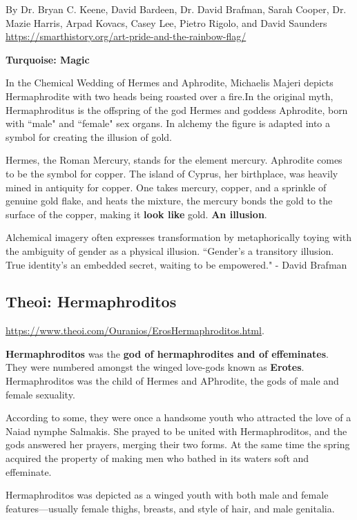 By Dr. Bryan C. Keene, David Bardeen, Dr. David Brafman, Sarah Cooper, Dr. Mazie Harris, Arpad Kovacs, Casey Lee, Pietro Rigolo, and David Saunders \url{https://smarthistory.org/art-pride-and-the-rainbow-flag/}

\textbf{Turquoise: Magic}

In the Chemical Wedding of Hermes and Aphrodite, Michaelis Majeri depicts Hermaphrodite with two heads being roasted over a fire.In the original myth, Hermaphroditus is the offspring of the god Hermes and goddess Aphrodite, born with ``male" and ``female" sex organs. In alchemy the figure is adapted into a symbol for creating the illusion of gold.

\begin{rmk}
    Hermes, the Roman Mercury, stands for the element mercury. Aphrodite comes to be the symbol for copper. The island of Cyprus, her birthplace, was heavily mined in antiquity for copper. One takes mercury, copper, and a sprinkle of genuine gold flake, and heats the mixture, the mercury bonds the gold to the surface of the copper, making it \textbf{look like} gold. \textbf{An illusion}.
\end{rmk}

Alchemical imagery often expresses transformation by metaphorically toying with the ambiguity of gender as a physical illusion. ``Gender's a transitory illusion. True identity's an embedded secret, waiting to be empowered." - David Brafman


\subsection{Theoi: Hermaphroditos}

\url{https://www.theoi.com/Ouranios/ErosHermaphroditos.html}. 

\textbf{Hermaphroditos} was the \textbf{god of hermaphrodites and of effeminates}. They were numbered amongst the winged love-gods known as \textbf{Erotes}. Hermaphroditos was the child of Hermes and APhrodite, the gods of male and female sexuality.

According to some, they were once a handsome youth who attracted the love of a Naiad nymphe Salmakis. She prayed to be united with Hermaphroditos, and the gods answered her prayers, merging their two forms. At the same time the spring acquired the property of making men who bathed in its waters soft and effeminate.

\begin{rmk}
    Hermaphroditos was depicted as a winged youth with both male and female features---usually female thighs, breasts, and style of hair, and male genitalia.
\end{rmk}


